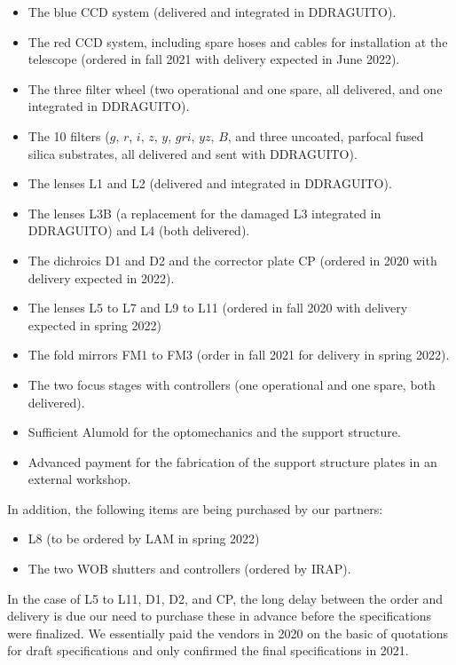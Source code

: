\documentclass{article}
\begin{document}
\begin{itemize}
    \item The blue CCD system (delivered and integrated in DDRAGUITO).
    \item The red CCD system, including spare hoses and cables for installation at the telescope (ordered in fall 2021 with delivery expected in June 2022).
    \item The three filter wheel (two operational and one spare, all delivered, and one integrated in DDRAGUITO).
    \item The 10 filters ($g$, $r$, $i$, $z$, $y$, $gri$, $yz$, $B$, and three uncoated, parfocal fused silica substrates, all delivered and sent with DDRAGUITO).
    \item The lenses L1 and L2 (delivered and integrated in DDRAGUITO).
    \item The lenses L3B (a replacement for the damaged L3 integrated in DDRAGUITO) and L4 (both delivered).
    \item The dichroics D1 and D2 and the corrector plate CP (ordered in 2020 with delivery expected in 2022).
    \item The lenses L5 to L7 and L9 to L11 (ordered in fall 2020 with delivery expected in spring 2022)
    \item The fold mirrors FM1 to FM3 (order in fall 2021 for delivery in spring 2022).
    \item The two focus stages with controllers (one operational and one spare, both delivered).
    \item Sufficient Alumold for the optomechanics and the support structure.
    \item Advanced payment for the fabrication of the support structure plates in an external workshop.
\end{itemize}

In addition, the following items are being purchased by our partners:

\begin{itemize}
    \item L8 (to be ordered by LAM in spring 2022)
    \item The two WOB shutters and controllers (ordered by IRAP).
\end{itemize}

In the case of L5 to L11, D1, D2, and CP, the long delay between the order and delivery is due our need to purchase these in advance before the specifications were finalized. We essentially paid the vendors in 2020 on the basic of quotations for draft specifications and only confirmed the final specifications in 2021.
\end{document}
